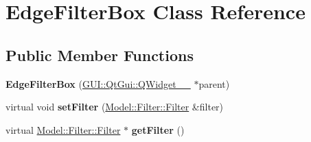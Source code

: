 \hypertarget{classGUI_1_1EdgeFilterBox}{}\section{Edge\+Filter\+Box Class Reference}
\label{classGUI_1_1EdgeFilterBox}
\subsection*{Public Member Functions}
\begin{DoxyCompactItemize}
\item 
\hypertarget{classGUI_1_1EdgeFilterBox_a829283d1074efd29172c6c9a2e769f6b}{}{\bfseries Edge\+Filter\+Box} (\hyperlink{classGUI_1_1QtGui_1_1QWidget____10}{G\+U\+I\+::\+Qt\+Gui\+::\+Q\+Widget\+\_\+\+\_} $\ast$parent)\label{classGUI_1_1EdgeFilterBox_a829283d1074efd29172c6c9a2e769f6b}

\item 
\hypertarget{classGUI_1_1EdgeFilterBox_ad7c0ee00fe3faac7942d75eec2a5342b}{}virtual void {\bfseries set\+Filter} (\hyperlink{classModel_1_1Filter_1_1Filter}{Model\+::\+Filter\+::\+Filter} \&filter)\label{classGUI_1_1EdgeFilterBox_ad7c0ee00fe3faac7942d75eec2a5342b}

\item 
\hypertarget{classGUI_1_1EdgeFilterBox_acef2029a93f4ab3a538cdb643b9c2613}{}virtual \hyperlink{classModel_1_1Filter_1_1Filter}{Model\+::\+Filter\+::\+Filter} $\ast$ {\bfseries get\+Filter} ()\label{classGUI_1_1EdgeFilterBox_acef2029a93f4ab3a538cdb643b9c2613}

\end{DoxyCompactItemize}
